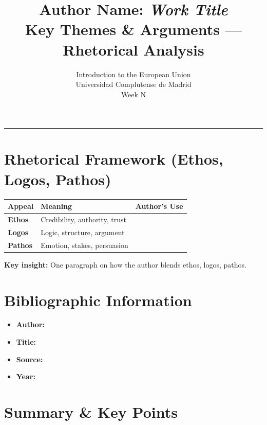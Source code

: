\documentclass[11pt,a4paper]{article}
\begin{document}
\title{Author Name: \textit{Work Title}\\Key Themes \& Arguments --- Rhetorical Analysis}
\author{Introduction to the European Union\\Universidad Complutense de Madrid\\Week N}
\date{}
\maketitle
\vspace{-1em}
\hrule
\vspace{1em}

\section*{Rhetorical Framework (Ethos, Logos, Pathos)}

\begin{table}[h]
\centering
\begin{tabular}{@{}lll@{}}
\toprule
\textbf{Appeal} & \textbf{Meaning} & \textbf{Author's Use} \\
\midrule
\textbf{Ethos} & Credibility, authority, trust & \\
\textbf{Logos} & Logic, structure, argument & \\
\textbf{Pathos} & Emotion, stakes, persuasion & \\
\bottomrule
\end{tabular}
\end{table}

\textbf{Key insight:} One paragraph on how the author blends ethos, logos, pathos.

\section*{Bibliographic Information}

\begin{itemize}
\item \textbf{Author:}
\item \textbf{Title:}
\item \textbf{Source:}
\item \textbf{Year:}
\end{itemize}

\section*{Summary \& Key Points}
\end{document}
